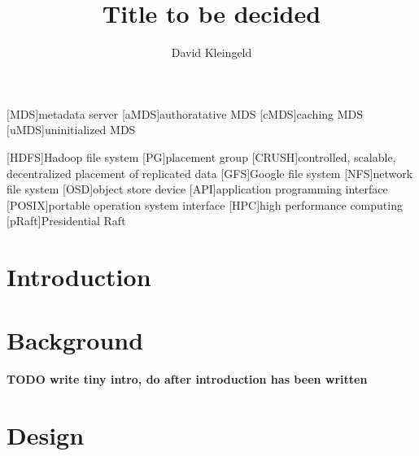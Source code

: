 \documentclass[lang=en, hanging-titles=true]{skrapport}
\title{Title to be decided}
\author{David Kleingeld}
\begin{document}
\begin{titlepage}
\maketitle
\end{titlepage}
\tableofcontents
\clearpage

\newcommand{\zookeeper}{ZooKeeper}
\newcommand{\raft}{Raft}
\newcommand{\paxos}{Paxos}
\newcommand{\multipaxos}{Multi-Paxos}
\newcommand{\ceph}{Ceph}
\newcommand{\zab}{Zab}

\newcommand{\name}{my system}
\newcommand{\Name}{My system}

\newcommand{\textacro}[1]{\small{#1}}
\begin{acronym}
	[\textacro{MDS}]{metadata server}
	[\textacro{aMDS}]{authoratative MDS}
	[\textacro{cMDS}]{caching MDS}
	[\textacro{uMDS}]{uninitialized MDS}

	[\textacro{HDFS}]{Hadoop file system}
	[\textacro{PG}]{placement group}
	[\textacro{CRUSH}]{controlled, scalable, decentralized placement of replicated data}
	[\textacro{GFS}]{Google file system}
	[\textacro{NFS}]{network file system}
	[\textacro{OSD}]{object store device}
	[\textacro{API}]{application programming interface}
	[\textacro{POSIX}]{portable operation system interface}
	[\textacro{HPC}]{high performance computing}
	[\textacro{pRaft}]{Presidential Raft}
\end{acronym}



\section{Introduction} \label{sec:intro}
 

\section{Background}
\textbf{TODO write tiny intro, do after introduction has been written}






\acresetall{}
\section{Design}



\clearpage
\appendix
\printbibliography
\end{document}
